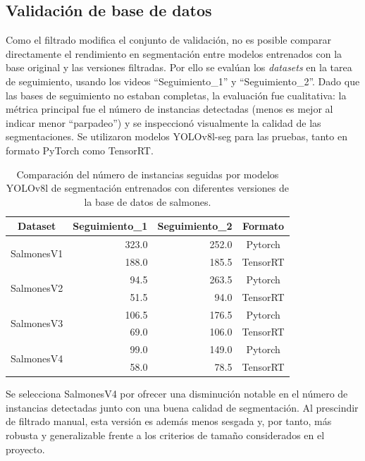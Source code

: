 \subsection{Validación de base de datos}
Como el filtrado modifica el conjunto de validación, no es posible comparar directamente el rendimiento en segmentación entre modelos entrenados con la base original y las versiones filtradas. Por ello se evalúan los \textit{datasets} en la tarea de seguimiento, usando los videos ``Seguimiento_1'' y ``Seguimiento_2''. Dado que las bases de seguimiento no estaban completas, la evaluación fue cualitativa: la métrica principal fue el número de instancias detectadas (menos es mejor al indicar menor ``parpadeo'') y se inspeccionó visualmente la calidad de las segmentaciones. Se utilizaron modelos YOLOv8l-seg para las pruebas, tanto en formato PyTorch como TensorRT.

\begin{table}[htbp]
\centering
\caption[Evaluación entre distintas versiones de la base de datos de salmones]{Comparación del número de instancias seguidas por modelos YOLOv8l de segmentación entrenados con diferentes versiones de la base de datos de salmones.}
\label{tab:seguimientos_versiones_dataset}
\begin{tabular}{|c|r|r|c|}
\hline
\textbf{Dataset} & \multicolumn{1}{c|}{\textbf{Seguimiento\_1}} & \multicolumn{1}{c|}{\textbf{Seguimiento\_2}} & \textbf{Formato} \\ \hline
\multirow{2}{*}{SalmonesV1} & 323.0 & 252.0 & Pytorch \\ \cline{2-4} 
 & 188.0 & 185.5 & TensorRT \\ \hline
\multirow{2}{*}{SalmonesV2} & 94.5 & 263.5 & Pytorch \\ \cline{2-4} 
 & 51.5 & 94.0 & TensorRT \\ \hline
\multirow{2}{*}{SalmonesV3} & 106.5 & 176.5 & Pytorch \\ \cline{2-4} 
 & 69.0 & 106.0 & TensorRT \\ \hline
\multirow{2}{*}{SalmonesV4} & 99.0 & 149.0 & Pytorch \\ \cline{2-4} 
 & 58.0 & 78.5 & TensorRT \\ \hline
\end{tabular}
\end{table}

Se selecciona SalmonesV4 por ofrecer una disminución notable en el número de instancias detectadas junto con una buena calidad de segmentación. Al prescindir de filtrado manual, esta versión es además menos sesgada y, por tanto, más robusta y generalizable frente a los criterios de tamaño considerados en el proyecto.


